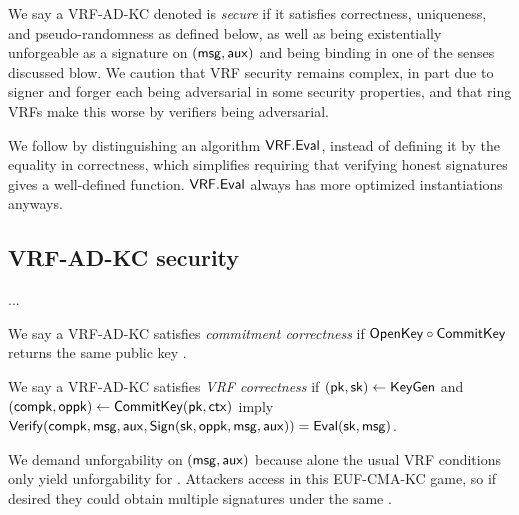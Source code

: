 

We say a VRF-AD-KC denoted \VRF is {\em secure} if it satisfies
 correctness, uniqueness, and pseudo-randomness as defined below,
 as well as being existentially unforgeable as a signature on $(\mathsf{msg},\mathsf{aux})$
 and being binding in one of the senses discussed blow.
We caution that VRF security remains complex, in part due to
signer and forger each being adversarial in some security properties,
and that ring VRFs make this worse by verifiers being adversarial.

We follow \cite{agg_dkg} by distinguishing an algorithm ${\mathsf{VRF}}.{\mathsf{Eval}}$,
 instead of defining it by the equality in correctness,
which simplifies requiring that verifying honest signatures gives a well-defined function.
${\mathsf{VRF}}.{\mathsf{Eval}}$ always has more optimized instantiations anyways.


\subsection{VRF-AD-KC security}

...

\begin{definition}
We say a VRF-AD-KC satisfies {\em commitment correctness} if
 ${\mathsf{OpenKey}} \circ {\ensuremath{\mathsf{CommitKey}}}$ returns the same public key \pk.
\end{definition}

\begin{definition}
We say a VRF-AD-KC satisfies {\em VRF correctness} if
$(\mathsf{pk},\mathsf{sk}) \leftarrow {\ensuremath{\mathsf{KeyGen}}}$ and $(\mathsf{compk},\mathsf{oppk}) \leftarrow {\ensuremath{\mathsf{CommitKey}}}(\mathsf{pk},\mathsf{ctx})$
imply
${\mathsf{Verify}}(\mathsf{compk},\mathsf{msg},\mathsf{aux},{\mathsf{Sign}}(\mathsf{sk},\mathsf{oppk},\mathsf{msg},\mathsf{aux})) = {\mathsf{Eval}}(\mathsf{sk},\mathsf{msg})$.
\end{definition}

We demand unforgability on $(\mathsf{msg},\mathsf{aux})$ because alone
 the usual VRF conditions only yield unforgability for \msg.
Attackers access \CommitKey in this EUF-CMA-KC game, so if desired
 they could obtain multiple signatures under the same \compk.

